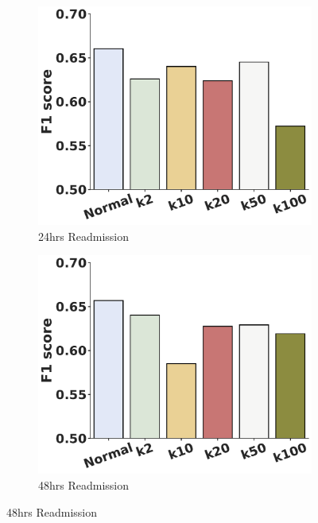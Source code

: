\documentclass{bioinfo}
\begin{document}
\begin{figure}[!tpb]
\centering
\begin{subfigure}[b]{.45\linewidth}
\centering
\includegraphics[width=\linewidth]{readmission_pred_24hrs.pdf}
\caption{24hrs Readmission}
\label{sfig:24hrsReadmission}
\end{subfigure}%
\begin{subfigure}[b]{.45\linewidth}
\centering
\includegraphics[width=\linewidth]{readmission_pred_48hrs.pdf}
\caption{48hrs Readmission}
\label{sfig:48hrsReadmission}
\end{subfigure}%



\end{figure}
\end{document}
